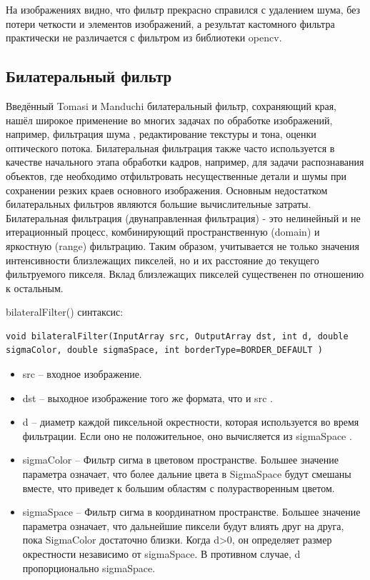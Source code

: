 \documentclass[14pt,a4paper,report]{report}
\begin{document}
На изображениях видно, что фильтр прекрасно справился с удалением шума, без потери четкости и элементов изображений, а результат кастомного фильтра практически не различается с фильтром из библиотеки opencv.




\subsection{Билатеральный фильтр}
Введённый Tomasi и Manduchi билатеральный фильтр, сохраняющий края, нашёл широкое применение во многих задачах по обработке изображений, например, фильтрация шума , редактирование текстуры и тона, оценки оптического потока. Билатеральная фильтрация также часто используется в качестве начального этапа обработки кадров, например, для задачи распознавания объектов, где необходимо отфильтровать несущественные детали и шумы при сохранении резких краев основного изображения. Основным недостатком билатеральных фильтров являются большие вычислительные затраты. Билатеральная фильтрация (двунаправленная фильтрация) - это нелинейный и не итерационный процесс, комбинирующий пространственную (domain) и яркостную (range) фильтрацию. Таким образом, учитывается не только значения интенсивности близлежащих пикселей, но и их расстояние до текущего фильтруемого пикселя. Вклад близлежащих пикселей существенен по отношению к остальным.

bilateralFilter() синтаксис:

\begin{lstlisting}
void bilateralFilter(InputArray src, OutputArray dst, int d, double sigmaColor, double sigmaSpace, int borderType=BORDER_DEFAULT )
\end{lstlisting}

\begin{itemize}

\item src – входное изображение.

\item dst – выходное изображение того же формата, что и src .

\item d – диаметр каждой пиксельной окрестности, которая используется во время фильтрации. Если оно не положительное, оно вычисляется из sigmaSpace .

\item sigmaColor – Фильтр сигма в цветовом пространстве. Большее значение параметра означает, что более дальние цвета в SigmaSpace будут смешаны вместе, что приведет к большим областям с полурастворенным цветом.

\item sigmaSpace – Фильтр сигма в координатном пространстве. Большее значение параметра означает, что дальнейшие пиксели будут влиять друг на друга, пока SigmaColor достаточно близки. Когда d>0, он определяет размер окрестности независимо от sigmaSpace. В противном случае, d пропорционально sigmaSpace.
\end{itemize}
\end{document}
